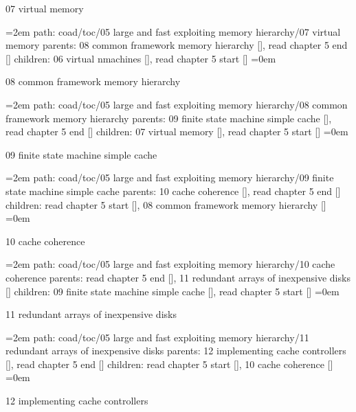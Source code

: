 \par\endgroup
\bigskip
{}
07 virtual memory
\smallskip
\par\begingroup
\leftskip=2em
path: coad/toc/05 large and fast exploiting memory hierarchy/07 virtual memory
\smallskip
parents:  08 common framework memory hierarchy [], read chapter 5 end []
\smallskip
children: 06 virtual nmachines [], read chapter 5 start []
\smallskip
\leftskip=0em
\par\endgroup
\bigskip
{}
08 common framework memory hierarchy
\smallskip
\par\begingroup
\leftskip=2em
path: coad/toc/05 large and fast exploiting memory hierarchy/08 common framework memory hierarchy
\smallskip
parents:  09 finite state machine simple cache [], read chapter 5 end []
\smallskip
children: 07 virtual memory [], read chapter 5 start []
\smallskip
\leftskip=0em
\par\endgroup
\bigskip
{}
09 finite state machine simple cache
\smallskip
\par\begingroup
\leftskip=2em
path: coad/toc/05 large and fast exploiting memory hierarchy/09 finite state machine simple cache
\smallskip
parents:  10 cache coherence [], read chapter 5 end []
\smallskip
children: read chapter 5 start [], 08 common framework memory hierarchy []
\smallskip
\leftskip=0em
\par\endgroup
\bigskip
{}
10 cache coherence
\smallskip
\par\begingroup
\leftskip=2em
path: coad/toc/05 large and fast exploiting memory hierarchy/10 cache coherence
\smallskip
parents:  read chapter 5 end [], 11 redundant arrays of inexpensive disks []
\smallskip
children: 09 finite state machine simple cache [], read chapter 5 start []
\smallskip
\leftskip=0em
\par\endgroup
\bigskip
{}
11 redundant arrays of inexpensive disks
\smallskip
\par\begingroup
\leftskip=2em
path: coad/toc/05 large and fast exploiting memory hierarchy/11 redundant arrays of inexpensive disks
\smallskip
parents:  12 implementing cache controllers [], read chapter 5 end []
\smallskip
children: read chapter 5 start [], 10 cache coherence []
\smallskip
\leftskip=0em
\par\endgroup
\bigskip
{}
12 implementing cache controllers
